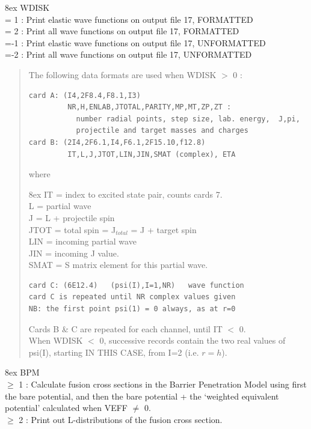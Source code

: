 \documentclass[11pt]{book}
\begin{document}
\hangindent 8ex  WDISK
\\  = 1 :  Print elastic wave functions on output file 17, FORMATTED
\\  = 2 :  Print   all   wave functions on output file 17, FORMATTED
\\  =-1 :  Print elastic wave functions on output file 17, UNFORMATTED
\\  =-2 :  Print   all   wave functions on output file 17, UNFORMATTED


\begin{quotation}
\noindent
The following data formats are used when WDISK $>$ 0 :
\begin{verbatim}
card A: (I4,2F8.4,F8.1,I3)
         NR,H,ENLAB,JTOTAL,PARITY,MP,MT,ZP,ZT :
           number radial points, step size, lab. energy,  J,pi,
           projectile and target masses and charges
card B: (2I4,2F6.1,I4,F6.1,2F15.10,f12.8)
         IT,L,J,JTOT,LIN,JIN,SMAT (complex), ETA
\end{verbatim}
where

\hangindent 8ex
IT = index to excited state pair, counts cards 7.\\
L  = partial wave\\
J  = L + projectile spin\\
JTOT = total spin = J$_{total}$ = J + target spin\\
LIN  = incoming partial wave\\
JIN  = incoming J value.\\
SMAT = S matrix element for this partial wave.\\

\begin{verbatim}
card C: (6E12.4)   (psi(I),I=1,NR)   wave function
card C is repeated until NR complex values given
NB: the first point psi(1) = 0 always, as at r=0
\end{verbatim}
Cards B \& C are repeated for each channel, until IT $<$ 0.
\\
When WDISK $<$ 0, successive records contain the two real values
of psi(I), starting IN THIS CASE, from I=2 (i.e. $r=h$).
\end{quotation}

\hangindent 8ex  BPM
\\  $\geq$ 1 : Calculate fusion cross sections in the Barrier Penetration
Model using first the bare potential, and then the bare potential + the
`weighted equivalent potential' calculated when VEFF $\neq$ 0.
\\  $\geq$ 2 : Print out L-distributions of the fusion cross section.
\end{document}
